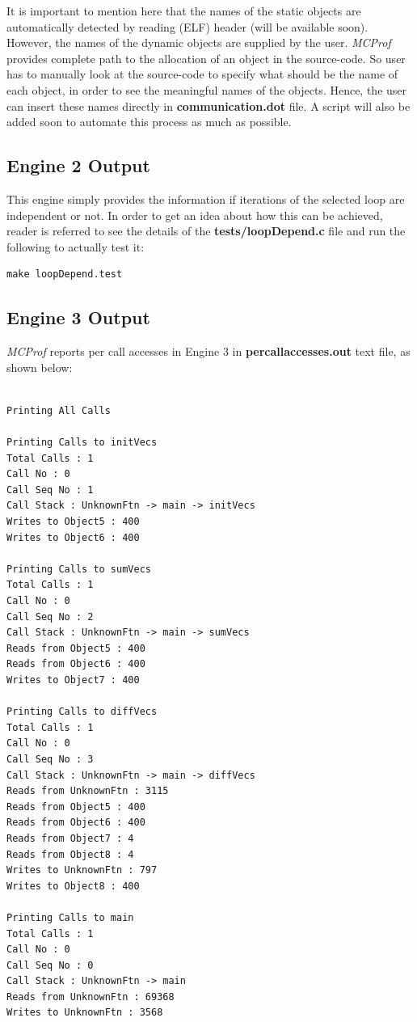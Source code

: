 \documentclass[10pt]{article}
\newcommand{\MCPROF}{\emph{MCProf}}
\begin{document}
It is important to mention here that the names of the static objects are 
automatically detected by reading (ELF) header (will be available soon). 
However, the names of the dynamic objects are supplied by the user. \MCPROF{} 
provides complete path to the allocation of an object in the source-code. So 
user has to manually look at the source-code to specify what should be the name 
of each object, in order to see the meaningful names of the objects. Hence, the 
user can insert these names directly in \textbf{communication.dot} file. A 
script will also be added soon to automate this process as much as possible.

\subsection{Engine 2 Output}
This engine simply provides the information if iterations of the selected loop
are independent or not. In order to get an idea about how this can be achieved,
reader is referred to see the details of the \textbf{tests/loopDepend.c} file
and run the following to actually test it:

{
\small
\begin{Verbatim}[frame=single]
make loopDepend.test
\end{Verbatim}
}

\subsection{Engine 3 Output}

\MCPROF{} reports per call accesses in Engine 3 in \textbf{percallaccesses.out}
text file, as shown below:

{
\scriptsize
\begin{Verbatim}[frame=single]

Printing All Calls

Printing Calls to initVecs
Total Calls : 1
Call No : 0
Call Seq No : 1
Call Stack : UnknownFtn -> main -> initVecs
Writes to Object5 : 400
Writes to Object6 : 400

Printing Calls to sumVecs
Total Calls : 1
Call No : 0
Call Seq No : 2
Call Stack : UnknownFtn -> main -> sumVecs
Reads from Object5 : 400
Reads from Object6 : 400
Writes to Object7 : 400

Printing Calls to diffVecs
Total Calls : 1
Call No : 0
Call Seq No : 3
Call Stack : UnknownFtn -> main -> diffVecs
Reads from UnknownFtn : 3115
Reads from Object5 : 400
Reads from Object6 : 400
Reads from Object7 : 4
Reads from Object8 : 4
Writes to UnknownFtn : 797
Writes to Object8 : 400

Printing Calls to main
Total Calls : 1
Call No : 0
Call Seq No : 0
Call Stack : UnknownFtn -> main
Reads from UnknownFtn : 69368
Writes to UnknownFtn : 3568
\end{Verbatim}
}
\end{document}
